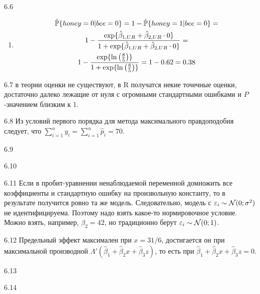 \begin{solution}{{6.6}}
\begin{enumerate}
\item
\begin{multline*}
\hat{\mathbb{P}}\{honey = 0| bee = 0\} = 1 - \hat{\mathbb{P}}\{honey=1|bee=0\} = \\
1 - \frac{\exp\{\hat{\beta}_{1, UR} + \hat{\beta}_{2, UR} \cdot 0\}}{1 + \exp\{\hat{\beta}_{1, UR} + \hat{\beta}_{2, UR} \cdot 0\}} =\\
1 - \frac{\exp\{\ln\left( \frac{8}{5} \right)\}}{1 + \exp\{\ln\left( \frac{8}{5} \right)\}} = 1 - 0.62 = 0.38
\end{multline*}
\end{enumerate}
\end{solution}
\protect \hypertarget {soln:6.7}{}
\begin{solution}{{6.7}}
в теории оценки не существуют, в R получатся некие точечные оценки, достаточно далеко лежащие от нуля с огромными стандартными ошибками и $P$-значением близким к 1.
\end{solution}
\protect \hypertarget {soln:6.8}{}
\begin{solution}{{6.8}}
Из условий первого порядка для метода максимального правдоподобия следует, что $\sum_{i=1}^n y_i = \sum_{i=1}^n \hat{p}_i=70$.
\end{solution}
\protect \hypertarget {soln:6.9}{}
\begin{solution}{{6.9}}
\end{solution}
\protect \hypertarget {soln:6.10}{}
\begin{solution}{{6.10}}
\end{solution}
\protect \hypertarget {soln:6.11}{}
\begin{solution}{{6.11}}
Если в пробит-уравнении ненаблюдаемой переменной домножить все коэффициенты и стандартную ошибку на произвольную константу, то в результате получится ровно та же модель. Следовательно, модель с $\varepsilon_i \sim \mathcal{N}(0;\sigma^2)$ не идентифицируема. Поэтому надо взять какое-то нормировочное условие. Можно взять, например, $\beta_2 = 42$, но традиционно берут $\varepsilon_i \sim \mathcal{N}(0;1)$.
\end{solution}
\protect \hypertarget {soln:6.12}{}
\begin{solution}{{6.12}}
Предельный эффект максимален при $x=31/6$, достигается он при максимальной производной $\Lambda'(\hat \beta_1 + \hat\beta_2x + \hat\beta_3z)$, то есть при $\hat \beta_1 + \hat\beta_2x + \hat\beta_3z=0$.
\end{solution}
\protect \hypertarget {soln:6.13}{}
\begin{solution}{{6.13}}
\end{solution}
\protect \hypertarget {soln:6.14}{}
\begin{solution}{{6.14}}
\end{solution}
